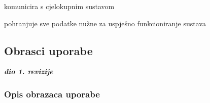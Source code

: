 \begin{packed_enum}
\begin{packed_enum}
				\end{packed_enum}
	
				\item  {}
				
					\begin{packed_enum}
						
						\item komunicira s cjelokupnim sustavom
						\item pohranjuje sve podatke nužne za uspješno funkcioniranje sustava
						
					\end{packed_enum}
			\end{packed_enum}
			
			\eject 
			
			
				
			\subsection{Obrasci uporabe}
				
				\textbf{\textit{dio 1. revizije}}
				
				\subsubsection{Opis obrazaca uporabe}
				
					

